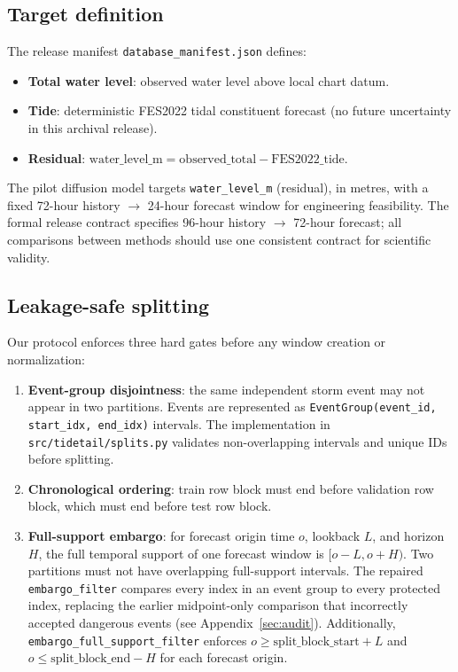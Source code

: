 \subsection{Target definition}
The release manifest \texttt{database\_manifest.json} defines:
\begin{itemize}
    \item \textbf{Total water level}: observed water level above local chart datum.
    \item \textbf{Tide}: deterministic FES2022 tidal constituent forecast (no future
    uncertainty in this archival release).
    \item \textbf{Residual}: $\text{water\_level\_m} = \text{observed\_total} - \text{FES2022\_tide}$.
\end{itemize}
The pilot diffusion model targets \texttt{water\_level\_m} (residual), in metres,
with a fixed 72-hour history $\rightarrow$ 24-hour forecast window for engineering
feasibility. The formal release contract specifies 96-hour history $\rightarrow$
72-hour forecast; all comparisons between methods should use one consistent
contract for scientific validity.

\subsection{Leakage-safe splitting}
Our protocol enforces three hard gates before any window creation or normalization:

\begin{enumerate}
    \item \textbf{Event-group disjointness}: the same independent storm event may
    not appear in two partitions. Events are represented as \texttt{EventGroup(event\_id,
    start\_idx, end\_idx)} intervals. The implementation in \texttt{src/tidetail/splits.py}
    validates non-overlapping intervals and unique IDs before splitting.

    \item \textbf{Chronological ordering}: train row block must end before
    validation row block, which must end before test row block.

    \item \textbf{Full-support embargo}: for forecast origin time $o$, lookback $L$,
    and horizon $H$, the full temporal support of one forecast window is
    $[o-L, o+H)$. Two partitions must not have overlapping full-support intervals.
    The repaired \texttt{embargo\_filter} compares every index in an event group
    to every protected index, replacing the earlier midpoint-only comparison that
    incorrectly accepted dangerous events (see Appendix~\ref{sec:audit}).
    Additionally, \texttt{embargo\_full\_support\_filter} enforces
    $o \geq \text{split\_block\_start} + L$ and $o \leq \text{split\_block\_end} - H$
    for each forecast origin.
\end{enumerate}


